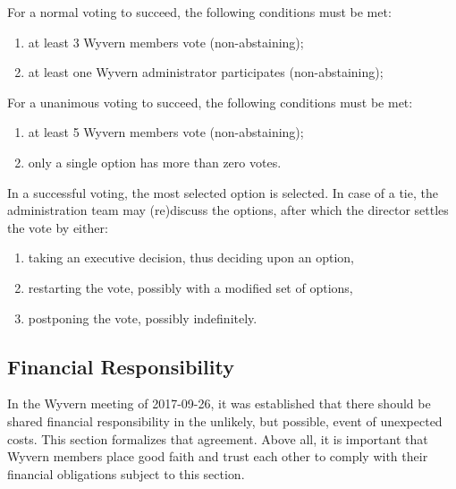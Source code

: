 \begin{enumerate}
    \begin{item}
        For a normal voting to succeed, the following conditions must be met:
        \begin{enumerate}
            \item at least 3 Wyvern members vote (non-abstaining);
            \item at least one Wyvern administrator participates (non-abstaining);
        \end{enumerate}
    \end{item}

    \begin{item}
        For a unanimous voting to succeed, the following conditions must be met:
        \begin{enumerate}
            \item at least 5 Wyvern members vote (non-abstaining);
            \item only a single option has more than zero votes.
        \end{enumerate}
    \end{item}

    \begin{item}
        In a successful voting, the most selected option is selected. In case of a tie, the administration team may (re)discuss the options, after which the director settles the vote by either:
        \begin{enumerate}
            \item taking an executive decision, thus deciding upon an option,
            \item restarting the vote, possibly with a modified set of options,
            \item postponing the vote, possibly indefinitely.
        \end{enumerate}
    \end{item}
    
    
\end{enumerate}

\subsection{Financial Responsibility}
In the Wyvern meeting of 2017-09-26, it was established that there should be shared financial responsibility in the unlikely, but possible, event of unexpected costs. This section formalizes that agreement. Above all, it is important that Wyvern members place good faith and trust each other to comply with their financial obligations subject to this section.

